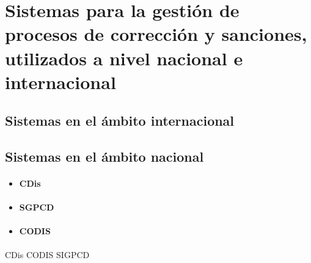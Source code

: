 \section[Sistemas homólogos]{Sistemas para la gestión de procesos de corrección y sanciones, utilizados a nivel nacional e internacional}

\subsection{Sistemas en el ámbito internacional}

\subsection{Sistemas en el ámbito nacional}
\begin{itemize}
	\item \paragraph{CDis}\item \paragraph{SGPCD}
	\item \paragraph{CODIS}
\end{itemize}

CDis \citep{acanda_del_cristo_cdis_2018}
CODIS \citet{fernandez_castillo_codis_2012}
SIGPCD \cite{fernandez_castillo_codis_2012}
	
